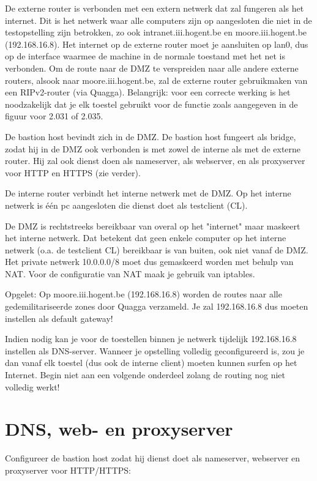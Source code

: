 \documentclass{report}
\begin{document}
De externe router is verbonden met een extern netwerk dat zal fungeren als het internet.
Dit is het netwerk waar alle computers zijn op aangesloten die niet in de testopstelling zijn betrokken, zo ook intranet.iii.hogent.be en moore.iii.hogent.be (192.168.16.8).
Het internet op de externe router moet je aansluiten op lan0, dus op de interface waarmee de machine in de normale toestand met het net is verbonden.
Om de route naar de DMZ te verspreiden naar alle andere externe routers, alsook naar moore.iii.hogent.be, zal de externe router gebruikmaken van een RIPv2-router (via Quagga).
Belangrijk: voor een correcte werking is het noodzakelijk dat je elk toestel gebruikt voor de functie zoals aangegeven in de figuur voor 2.031 of 2.035.

De bastion host bevindt zich in de DMZ.
De bastion host fungeert als bridge, zodat hij in de DMZ ook verbonden is met zowel de interne als met de externe router.
Hij zal ook dienst doen als nameserver, als webserver, en als proxyserver voor HTTP en HTTPS (zie verder).

De interne router verbindt het interne netwerk met de DMZ. Op het interne netwerk is één pc aangesloten die dienst doet als testclient (CL).

De DMZ is rechtstreeks bereikbaar van overal op het "internet" maar maskeert het interne netwerk.
Dat betekent dat geen enkele computer op het interne netwerk (o.a. de testclient CL) bereikbaar is van buiten, ook niet vanaf de DMZ.
Het private netwerk 10.0.0.0/8 moet dus gemaskeerd worden met behulp van NAT.
Voor de configuratie van NAT maak je gebruik van iptables.

Opgelet:
Op moore.iii.hogent.be (192.168.16.8) worden de routes naar alle gedemilitariseerde zones door Quagga verzameld.
Je zal 192.168.16.8 dus moeten instellen als default gateway!

Indien nodig kan je voor de toestellen binnen je netwerk tijdelijk 192.168.16.8 instellen als DNS-server.
Wanneer je opstelling volledig geconfigureerd is, zou je dan vanaf elk toestel (dus ook de interne client) moeten kunnen surfen op het Internet.
Begin niet aan een volgende onderdeel zolang de routing nog niet volledig werkt!
\section{DNS, web- en proxyserver}

Configureer de bastion host zodat hij dienst doet als nameserver, webserver en proxyserver voor HTTP/HTTPS:
\end{document}
